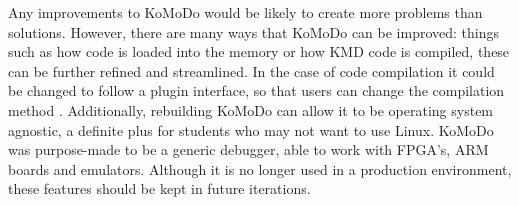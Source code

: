 %
Any improvements to KoMoDo would be likely to create more problems than solutions. However, there are many ways that KoMoDo can be improved: things such as how code is loaded into the memory or how KMD code is compiled, these can be further refined and streamlined. In the case of code compilation it could be changed to follow a plugin interface, so that users can change the compilation method . Additionally, rebuilding KoMoDo can allow it to be operating system agnostic, a definite plus for students who may not want to use Linux. KoMoDo was purpose-made to be a generic debugger, able to work with FPGA's, ARM boards and emulators. Although it is no longer used in a production environment, these features should be kept in future iterations.

